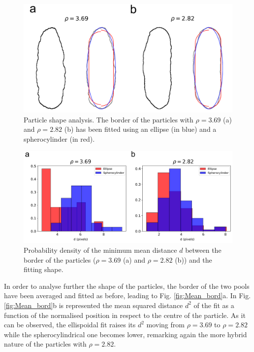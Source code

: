 \documentclass[aip,graphicx]{revtex4-1}
\begin{document}
\begin{figure}
    \centering
    \includegraphics[width=0.95\columnwidth]{Part fit.png}
    \caption{Particle shape analysis. The border of the particles with $\rho = 3.69$ (a) and $\rho = 2.82$ (b) has been fitted using an ellipse (in blue) and a spherocylinder (in red).}
    \label{fig:Part_fit}
\end{figure}


\begin{figure}
    \centering
    \includegraphics[width=0.95\columnwidth]{Mean_dist.png}
    \caption{Probability density of the minimum mean distance $d$ between the border of the particles ($\rho = 3.69$ (a) and $\rho = 2.82$ (b)) and the fitting shape.}
    \label{fig:Mean_dist}
\end{figure}

In order to analyse further the shape of the particles, the border of the two pools have been averaged and fitted as before, leading to Fig. \ref{fig:Mean_bord}a. In Fig. \ref{fig:Mean_bord}b is represented the mean squared distance $d^2$ of the fit as a function of the normalised position in respect to the centre of the particle. As it can be observed, the ellispoidal fit raises its $d^2$ moving from $\rho=3.69$ to $\rho=2.82$ while the spherocylindrical one becomes lower, remarking again the more hybrid nature of the particles with $\rho=2.82$.
\end{document}
